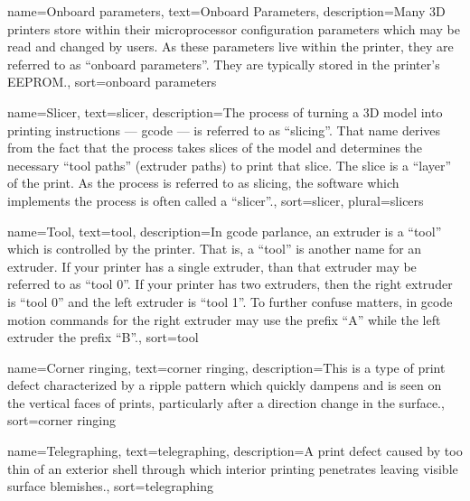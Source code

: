 {
        name={Onboard parameters},
        text={Onboard Parameters},
        description={Many 3D printers store within their microprocessor
configuration parameters which may be read and changed by users.  As these
parameters live within the printer, they are referred to as ``onboard
parameters''.  They are typically stored in the printer's EEPROM.},
        sort=onboard parameters
}

{
        name={Slicer},
        text={slicer},
        description={The process of turning a 3D model into printing
instructions --- gcode --- is referred to as ``slicing''.  That name
derives from the fact that the process takes slices of the model
and determines the necessary ``tool paths'' (extruder paths) to print
that slice.  The slice is a ``layer'' of the print.  As the process
is referred to as slicing, the software which implements the process
is often called a ``slicer''.},
        sort={slicer},
        plural=slicers
}

{
        name={Tool},
        text={tool},
        description={In gcode parlance, an extruder is a ``tool''
which is controlled by the printer.  That is, a ``tool'' is another name for
an extruder.  If your printer has a single extruder, than that extruder
may be referred to as ``tool 0''.  If your printer has two extruders,
then the right extruder is ``tool 0'' and the left extruder is ``tool 1''.
To further confuse matters, in gcode motion commands for the right
extruder may use the prefix ``A'' while the left extruder the prefix ``B''.},
        sort=tool
}

{
        name={Corner ringing},
        text={corner ringing},
        description={This is a type of print defect characterized by a ripple pattern which
quickly dampens and is seen on the vertical faces of prints, particularly
after a direction change in the surface.},
        sort=corner ringing
}

{
        name={Telegraphing},
        text={telegraphing},
        description={A print defect caused by too thin of an exterior
shell through which interior printing penetrates leaving visible surface
blemishes.},
        sort=telegraphing
}

